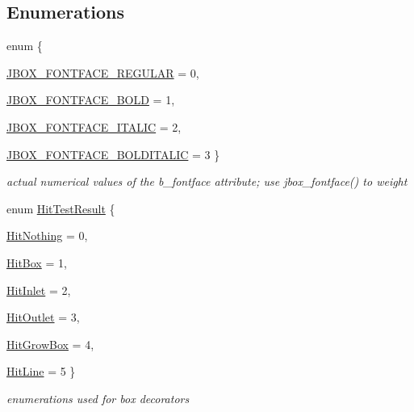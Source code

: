 \subsection*{Enumerations}
\begin{DoxyCompactItemize}
\item 
enum \{ \par
\hyperlink{group__jbox_gga80155586fa275b28773c9b203f52cabaa0071b2aa858b0b85866ec55f920661ea}{JBOX\_\-FONTFACE\_\-REGULAR} =  0, 
\par
\hyperlink{group__jbox_gga80155586fa275b28773c9b203f52cabaa7c5afcc54470110f9adafe6643860e33}{JBOX\_\-FONTFACE\_\-BOLD} =  1, 
\par
\hyperlink{group__jbox_gga80155586fa275b28773c9b203f52cabaa804e35b0947d1056b75c0b7416aed5f1}{JBOX\_\-FONTFACE\_\-ITALIC} =  2, 
\par
\hyperlink{group__jbox_gga80155586fa275b28773c9b203f52cabaac504521024538cbb38406272126cb30b}{JBOX\_\-FONTFACE\_\-BOLDITALIC} =  3
 \}
\begin{DoxyCompactList}\small\item\em actual numerical values of the b\_\-fontface attribute; use jbox\_\-fontface() to weight \item\end{DoxyCompactList}\item 
enum \hyperlink{group__jbox_ga956a254a140565aa9ff36a514740e021}{HitTestResult} \{ \par
\hyperlink{group__jbox_gga956a254a140565aa9ff36a514740e021a3bb67caa8d046ec70d5f467d64a6a290}{HitNothing} =  0, 
\par
\hyperlink{group__jbox_gga956a254a140565aa9ff36a514740e021a221361506a6a16b6c6ef01e0df8ba1c8}{HitBox} =  1, 
\par
\hyperlink{group__jbox_gga956a254a140565aa9ff36a514740e021abbaf64215e72c962b14e40c5a44daaab}{HitInlet} =  2, 
\par
\hyperlink{group__jbox_gga956a254a140565aa9ff36a514740e021a3614154efb6de5f3dd2e9b33f04b755e}{HitOutlet} =  3, 
\par
\hyperlink{group__jbox_gga956a254a140565aa9ff36a514740e021ada85a1e80aea2609cb61236fce30e53c}{HitGrowBox} =  4, 
\par
\hyperlink{group__jbox_gga956a254a140565aa9ff36a514740e021aa40eb7d004396706e33f989330975eaa}{HitLine} =  5
 \}
\begin{DoxyCompactList}\small\item\em enumerations used for box decorators \item\end{DoxyCompactList}\end{DoxyCompactItemize}
